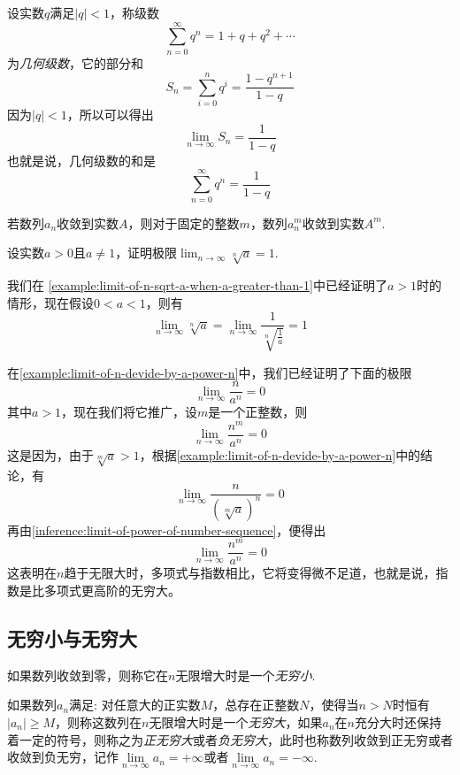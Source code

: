 \begin{example}[几何级数]
  设实数$q$满足$|q|<1$，称级数
  \[ \sum_{n=0}^{\infty} q^n = 1+q+q^2+\cdots  \]
  为\emph{几何级数}，它的部分和
  \[ S_n = \sum_{i=0}^n q^i = \frac{1-q^{n+1}}{1-q} \]
  因为$|q|<1$，所以可以得出
  \[ \lim_{n \to \infty} S_n = \frac{1}{1-q} \]
  也就是说，几何级数的和是
  \[ \sum_{n=0}^{\infty} q^n = \frac{1}{1-q} \]
\end{example}

\begin{inference}
  \label{inference:limit-of-power-of-number-sequence}
  若数列$a_n$收敛到实数$A$，则对于固定的整数$m$，数列$a_n^m$收敛到实数$A^m$.
\end{inference}

\begin{example}
  \label{example:limit-of-n-sqrt-a}
  设实数$a>0$且$a \neq 1$，证明极限$\lim_{n \to \infty} \sqrt[n]{a} = 1$.

  我们在 \autoref{example:limit-of-n-sqrt-a-when-a-greater-than-1}中已经证明了$a>1$时的情形，现在假设$0<a<1$，则有
  \[ \lim_{n \to \infty} \sqrt[n]{a} = \lim_{n \to \infty} \frac{1}{\sqrt[n]{\frac{1}{a}}} = 1 \]
\end{example}

\begin{example}
  \label{example:limit-of-n-power-m-devide-by-a-power-n}
  在\autoref{example:limit-of-n-devide-by-a-power-n}中，我们已经证明了下面的极限
  \[ \lim_{n \to \infty} \frac{n}{a^n} = 0 \]
  其中$a>1$，现在我们将它推广，设$m$是一个正整数，则
  \[ \lim_{n \to \infty} \frac{n^m}{a^n} = 0 \]
  这是因为，由于$\sqrt[m]{a}>1$，根据\autoref{example:limit-of-n-devide-by-a-power-n}中的结论，有
  \[ \lim_{n \to \infty} \frac{n}{(\sqrt[m]{a})^n} = 0 \]
 再由\autoref{inference:limit-of-power-of-number-sequence}，便得出
  \[ \lim_{n \to \infty} \frac{n^m}{a^n} = 0 \]
  这表明在$n$趋于无限大时，多项式与指数相比，它将变得微不足道，也就是说，指数是比多项式更高阶的无穷大。
\end{example}


\subsection{无穷小与无穷大}
\label{sec:infinite-small-and-great}

\begin{definition}
  如果数列收敛到零，则称它在$n$无限增大时是一个\emph{无穷小}.
\end{definition}

\begin{definition}
  如果数列$a_n$满足: 对任意大的正实数$M$，总存在正整数$N$，使得当$n>N$时恒有$|a_n|\geqslant M$，则称这数列在$n$无限增大时是一个\emph{无穷大}，如果$a_n$在$n$充分大时还保持着一定的符号，则称之为\emph{正无穷大}或者\emph{负无穷大}，此时也称数列收敛到正无穷或者收敛到负无穷，记作$\lim\limits_{n \to \infty} a_n = + \infty$或者$\lim\limits_{n \to \infty} a_n = -\infty$.
\end{definition}

